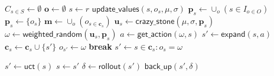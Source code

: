 \begin{algorithm}
	\caption{$\mathsf{OL-MCTS}(O, r, t, d, v, \mu, \sigma)$}
	\label{alg:olmcts}
	\begin{algorithmic}[1]
		\State $C_{s \in S} \gets \emptyset$
		\State $\mathbf{o} \gets \emptyset$
		 \label{alg:olmcts:mainloop}
			\State $s \gets r$
			 \label{alg:olmcts:innerloop}
				 \label{alg:olmcts:sp}
					\State $\mathsf{update\_values}(s, o_s, \mu, \sigma)$ 
					\State $\mathbf{p}_s \gets \cup_o (s \in I_{o \in O})$
				\Else
					\State $\mathbf{p}_s \gets \{o_s\}$
				\EndIf \label{alg:olmcts:scs}
				\State $\mathbf{m} \gets \cup_o (o_{s \in \mathbf{c}_s})$
				 
					\State $\mathbf{u}_s \gets \mathsf{crazy\_stone}(\mu, \sigma, \mathbf{p}_s)$
					\State $\omega \gets \mathsf{weighted\_random}(\mathbf{u}_s, \mathbf{p}_s)$
					 
						\State $a \gets \mathsf{get\_action}(\omega, s)$ 
						\State $s' \gets \mathsf{expand}(s, a)$ 
						\State $\mathbf{c}_s \gets \mathbf{c}_s \cup \{s'\}$
						\State $o_{s'} \gets \omega$
						\State \textbf{break}
					\Else
						\State $s' \gets s \in \mathbf{c}_s : o_s = \omega$
					\EndIf

				\Else \Comment{Apply \textsf{uct}}
					\State $s' \gets \mathsf{uct}(s)$ \label{alg:olmcts:uct}
				\EndIf \label{alg:olmcts:ecs}
				\State $s \gets s'$ \label{alg:olmcts:ss}
			\EndWhile
			\State $\delta \gets \mathsf{rollout}(s')$ \label{alg:olmcts:rollout}
			\State $\mathsf{back\_up}(s', \delta)$ \label{alg:olmcts:backup}
		\EndWhile
	\end{algorithmic}
\end{algorithm}
